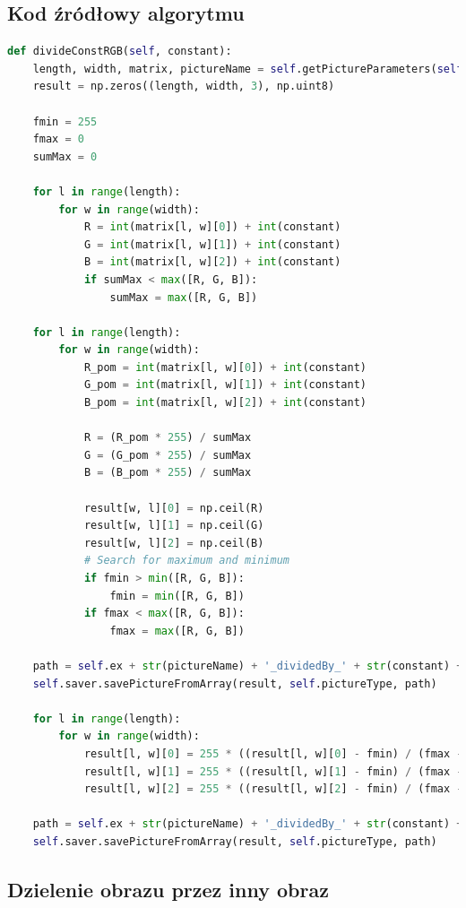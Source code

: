 \documentclass[a4paper,12pt, titlepage]{report}
\begin{document}
\subsection*{Kod źródłowy algorytmu}
\begin{lstlisting}[language=Python]
def divideConstRGB(self, constant):
    length, width, matrix, pictureName = self.getPictureParameters(self.pic1)
    result = np.zeros((length, width, 3), np.uint8)

    fmin = 255
    fmax = 0
    sumMax = 0

    for l in range(length):
        for w in range(width):
            R = int(matrix[l, w][0]) + int(constant)
            G = int(matrix[l, w][1]) + int(constant)
            B = int(matrix[l, w][2]) + int(constant)
            if sumMax < max([R, G, B]):
                sumMax = max([R, G, B])

    for l in range(length):
        for w in range(width):
            R_pom = int(matrix[l, w][0]) + int(constant)
            G_pom = int(matrix[l, w][1]) + int(constant)
            B_pom = int(matrix[l, w][2]) + int(constant)

            R = (R_pom * 255) / sumMax
            G = (G_pom * 255) / sumMax
            B = (B_pom * 255) / sumMax

            result[w, l][0] = np.ceil(R)
            result[w, l][1] = np.ceil(G)
            result[w, l][2] = np.ceil(B)
            # Search for maximum and minimum
            if fmin > min([R, G, B]):
                fmin = min([R, G, B])
            if fmax < max([R, G, B]):
                fmax = max([R, G, B])

    path = self.ex + str(pictureName) + '_dividedBy_' + str(constant) + '.png'
    self.saver.savePictureFromArray(result, self.pictureType, path)

    for l in range(length):
        for w in range(width):
            result[l, w][0] = 255 * ((result[l, w][0] - fmin) / (fmax - fmin))
            result[l, w][1] = 255 * ((result[l, w][1] - fmin) / (fmax - fmin))
            result[l, w][2] = 255 * ((result[l, w][2] - fmin) / (fmax - fmin))

    path = self.ex + str(pictureName) + '_dividedBy_' + str(constant) + '_normalized.png'
    self.saver.savePictureFromArray(result, self.pictureType, path)
\end{lstlisting}

\subsection{Dzielenie obrazu przez inny obraz}
\end{document}
